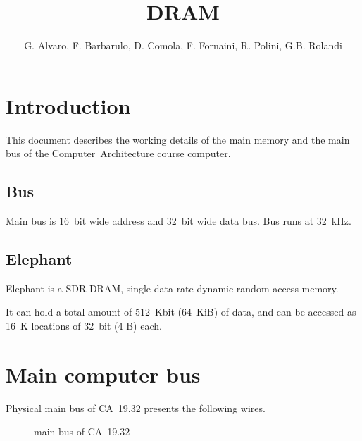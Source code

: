 \documentclass[a4paper,12pt]{article}
\title{\memoryname{} DRAM}
\author{G. Alvaro, F. Barbarulo, D. Comola, F. Fornaini, R. Polini, G.B. Rolandi}
\makeatletter
\newcommand*{\textoverline}[1]{$\overline{\hbox{#1}}\m@th$}
\newcommand{\computername}{CA~19.32}
\newcommand{\memoryname}{Elephant}
\makeatother
\begin{document}
\maketitle
\tableofcontents

\clearpage
\clearpage

\section{Introduction}

This document describes the working details of the main memory and the main bus of the Computer~Architecture course computer.

\subsection{Bus}
Main bus is 16~bit wide address and 32~bit wide data bus.
Bus runs at 32~kHz.

\subsection{\memoryname{}}
\memoryname{} is a SDR DRAM, single data rate dynamic random access memory.

It can hold a total amount of 512~Kbit (64~KiB) of data, and can be accessed as 16~K locations of 32~bit (4 B) each.

\section{Main computer bus}
Physical main bus of \computername{} presents the following wires.

\begin{figure}[H]
\centering
{}
\caption{main bus of \computername{}}
\end{figure}
\end{document}
